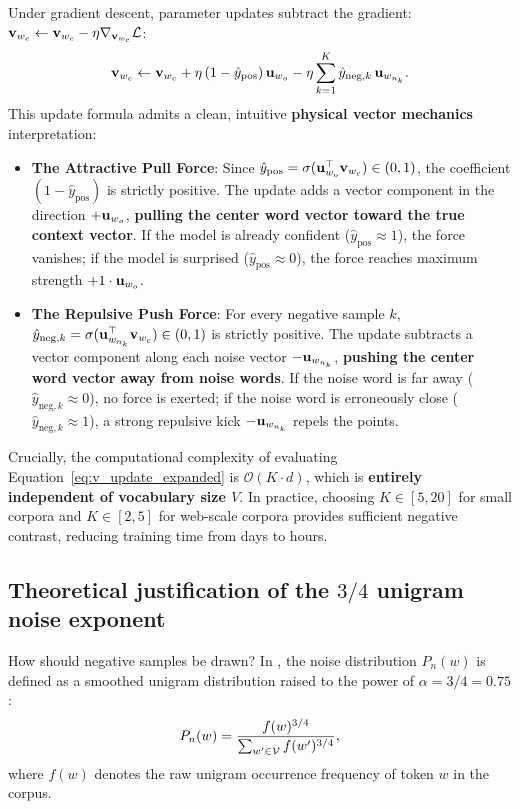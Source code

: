 \documentclass[../../main.tex]{subfiles}
\begin{document}
Under gradient descent, parameter updates subtract the gradient: $\mathbf{v}_{w_c} \leftarrow \mathbf{v}_{w_c} - \eta \nabla_{\mathbf{v}_{w_c}} \mathcal{L}$:
\begin{equation}
\label{eq:v_update_expanded}
\mathbf{v}_{w_c} \leftarrow \mathbf{v}_{w_c} + \eta \left( 1 - \hat{y}_{\text{pos}} \right) \mathbf{u}_{w_o} - \eta \sum_{k=1}^K \hat{y}_{\text{neg}, k} \, \mathbf{u}_{w_{n_k}}.
\end{equation}
This update formula admits a clean, intuitive \textbf{physical vector mechanics} interpretation:
\begin{itemize}
    \item \textbf{The Attractive Pull Force}: Since $\hat{y}_{\text{pos}} = \sigma(\mathbf{u}_{w_o}^\top \mathbf{v}_{w_c}) \in (0, 1)$, the coefficient $(1 - \hat{y}_{\text{pos}})$ is strictly positive. The update adds a vector component in the direction $+\mathbf{u}_{w_o}$, \textbf{pulling the center word vector toward the true context vector}. If the model is already confident ($\hat{y}_{\text{pos}} \approx 1$), the force vanishes; if the model is surprised ($\hat{y}_{\text{pos}} \approx 0$), the force reaches maximum strength $+1 \cdot \mathbf{u}_{w_o}$.
    \item \textbf{The Repulsive Push Force}: For every negative sample $k$, $\hat{y}_{\text{neg}, k} = \sigma(\mathbf{u}_{w_{n_k}}^\top \mathbf{v}_{w_c}) \in (0, 1)$ is strictly positive. The update subtracts a vector component along each noise vector $-\mathbf{u}_{w_{n_k}}$, \textbf{pushing the center word vector away from noise words}. If the noise word is far away ($\hat{y}_{\text{neg}, k} \approx 0$), no force is exerted; if the noise word is erroneously close ($\hat{y}_{\text{neg}, k} \approx 1$), a strong repulsive kick $-\mathbf{u}_{w_{n_k}}$ repels the points.
\end{itemize}

Crucially, the computational complexity of evaluating Equation~\eqref{eq:v_update_expanded} is $\mathcal{O}(K \cdot d)$, which is \textbf{entirely independent of vocabulary size $V$}. In practice, choosing $K \in [5, 20]$ for small corpora and $K \in [2, 5]$ for web-scale corpora provides sufficient negative contrast, reducing training time from days to hours.

\subsection{Theoretical justification of the \texorpdfstring{$3/4$}{3/4} unigram noise exponent}
\label{subsec:unigram_three_quarters}

How should negative samples be drawn? In \cite{mikolov2013distributed}, the noise distribution $P_n(w)$ is defined as a smoothed unigram distribution raised to the power of $\alpha = 3/4 = 0.75$:
\begin{equation}
\label{eq:unigram_three_quarters}
P_n(w) = \frac{f(w)^{3/4}}{\sum_{w' \in \mathcal{V}} f(w')^{3/4}},
\end{equation}
where $f(w)$ denotes the raw unigram occurrence frequency of token $w$ in the corpus.
\end{document}
